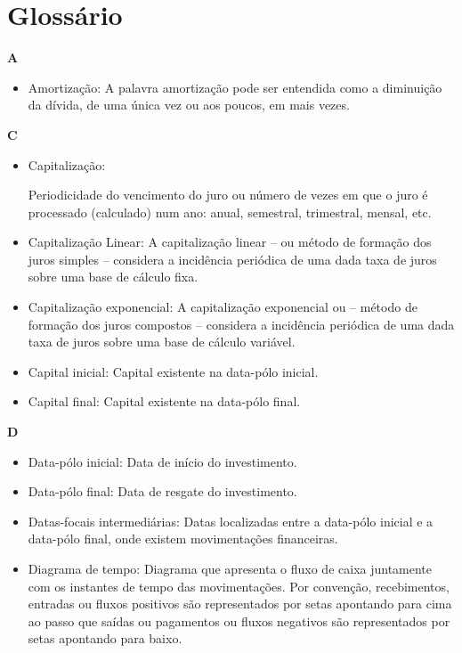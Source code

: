 \chapter{Glossário} \label{glossario}

\textbf{A}

\begin{itemize}
\item Amortização:
    A palavra amortização pode ser entendida como a diminuição da dívida, de uma única vez ou aos poucos, em mais vezes. 
\end{itemize}

\textbf{C}
\begin{itemize}
\item Capitalização: 

    Periodicidade do vencimento do juro ou número de vezes em que o juro é processado (calculado) num ano: anual, semestral, trimestral, mensal, etc. 

\item Capitalização Linear:
    A capitalização linear – ou método de formação dos juros simples – considera a incidência periódica de uma dada taxa de juros sobre uma base de cálculo fixa. 

\item Capitalização exponencial:
    A capitalização exponencial ou – método de formação dos juros compostos – considera a incidência periódica de uma dada taxa de juros sobre uma base de cálculo variável. 

\item Capital inicial:
    Capital existente na data-pólo inicial. 

\item Capital final:
    Capital existente na data-pólo final. 

\end{itemize}

\textbf{D}
\begin{itemize}
 \item Data-pólo inicial:
    Data de início do investimento. 

\item Data-pólo final:
    Data de resgate do investimento. 

\item Datas-focais intermediárias:
    Datas localizadas entre a data-pólo inicial e a data-pólo final, onde existem movimentações financeiras. 

\item Diagrama de tempo:
    Diagrama que apresenta o fluxo de caixa juntamente com os instantes de tempo das movimentações. Por convenção, recebimentos, entradas ou fluxos positivos são representados por setas apontando para cima ao passo que saídas ou pagamentos ou fluxos negativos são representados por setas apontando para baixo. 
\end{itemize}


